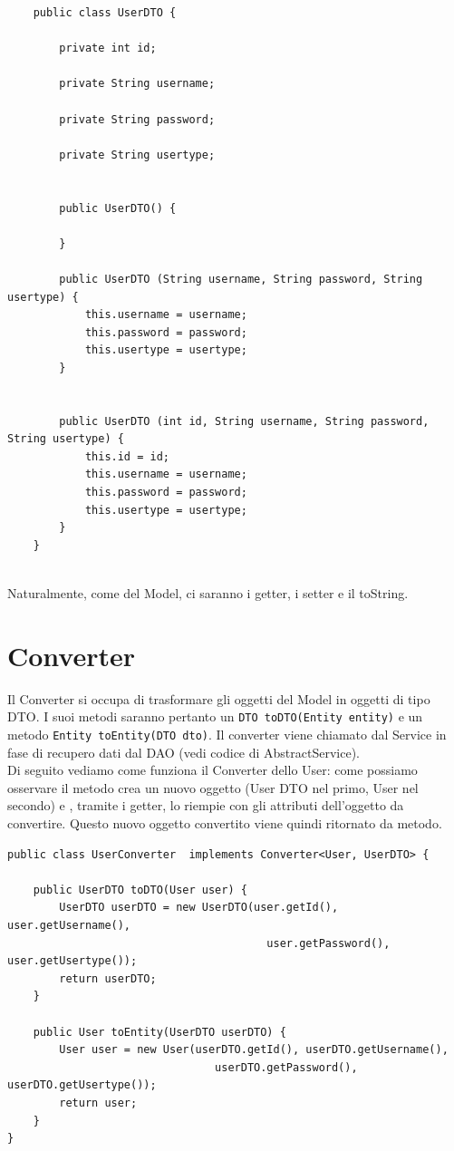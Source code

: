 \documentclass[a4paper,12 pt]{article}
\begin{document}
\begin{lstlisting}
	public class UserDTO {
	
		private int id;
		
		private String username;
		
		private String password;
		
		private String usertype;
		
		
		public UserDTO() {
		
		}
		
		public UserDTO (String username, String password, String usertype) {
			this.username = username;
			this.password = password;
			this.usertype = usertype;
		}
	
	
		public UserDTO (int id, String username, String password, String usertype) {
			this.id = id;
			this.username = username;
			this.password = password;
			this.usertype = usertype;
		}
	}
	
\end{lstlisting}

Naturalmente, come del Model, ci saranno i getter, i setter e il toString.
\section{Converter}

Il Converter si occupa di trasformare gli oggetti del Model in oggetti di tipo DTO. I suoi metodi saranno pertanto un \texttt{DTO toDTO(Entity entity)} e un metodo \texttt{Entity toEntity(DTO dto)}. Il converter viene chiamato dal Service in fase di recupero dati dal DAO (vedi codice di AbstractService).\\

Di seguito vediamo come funziona il Converter dello User: come possiamo osservare il metodo crea un nuovo oggetto (User DTO nel primo, User nel secondo) e , tramite i getter, lo riempie con gli attributi dell'oggetto da convertire. Questo nuovo oggetto convertito viene quindi ritornato da metodo.

	\begin{lstlisting}
public class UserConverter  implements Converter<User, UserDTO> {

	public UserDTO toDTO(User user) {
		UserDTO userDTO = new UserDTO(user.getId(), user.getUsername(),
		 								user.getPassword(), user.getUsertype());
		return userDTO;
	}
	
	public User toEntity(UserDTO userDTO) {
		User user = new User(userDTO.getId(), userDTO.getUsername(),
		 						userDTO.getPassword(), userDTO.getUsertype());
		return user;
	}
}
	\end{lstlisting}
\end{document}

